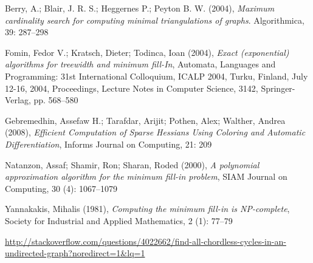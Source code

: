\documentclass{article}
\begin{document}
\begin{thebibliography}{20}
Berry, A.; Blair, J. R. S.; Heggernes P.; Peyton B. W. (2004), \textit{Maximum cardinality search for computing minimal triangulations of graphs}.
Algorithmica, 39: 287–298

Fomin, Fedor V.; Kratsch, Dieter; Todinca, Ioan (2004), \textit{Exact (exponential) algorithms for treewidth and minimum fill-In}, Automata, Languages and Programming: 31st International Colloquium, ICALP 2004, Turku, Finland, July 12-16, 2004, Proceedings, Lecture Notes in Computer Science, 3142, Springer-Verlag, pp. 568–580

Gebremedhin, Assefaw H.; Tarafdar, Arijit; Pothen, Alex; Walther, Andrea (2008), \textit{Efficient Computation of Sparse Hessians Using Coloring and Automatic Differentiation}, Informs Journal on Computing, 21: 209

Natanzon, Assaf; Shamir, Ron; Sharan, Roded (2000), \textit{A polynomial approximation algorithm for the minimum fill-in problem}, SIAM Journal on Computing, 30 (4): 1067–1079

Yannakakis, Mihalis (1981), \textit{Computing the minimum fill-in is NP-complete}, Society for Industrial and Applied Mathematics, 2 (1): 77–79

\url{http://stackoverflow.com/questions/4022662/find-all-chordless-cycles-in-an-undirected-graph?noredirect=1\&lq=1}

\end{thebibliography}
\end{document}
